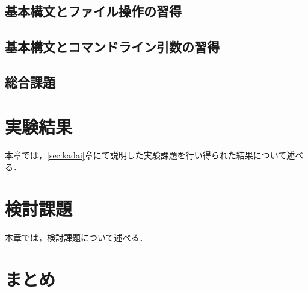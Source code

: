 \documentclass[uplatex,dvipdfmx,12pt]{jsarticle}
\begin{document}
\subsection{基本構文とファイル操作の習得}

\subsection{基本構文とコマンドライン引数の習得}

\subsection{総合課題}
\newpage
\section{実験結果}
本章では，\ref{sec:kadai}章にて説明した実験課題を行い得られた結果について述べる．



\newpage

\section{検討課題}
本章では，検討課題について述べる．



\newpage
\section{まとめ}

\newpage
\begin{thebibliography}{99}

\end{thebibliography}
\end{document}
